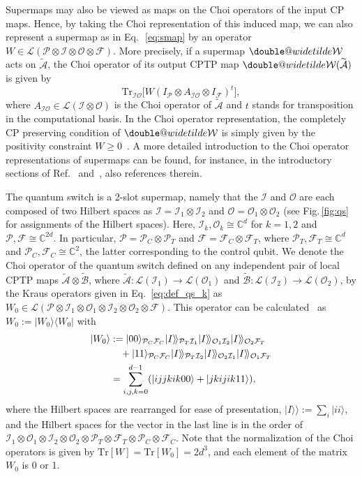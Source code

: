 \documentclass[a4paper,twocolumn,accepted=2022-10-23]{quantumarticle}
\makeatletter
\newcommand{\ket}[1]{\vert {#1} \rangle}
\newcommand{\kket}[1]{\vert {#1} \rangle\!\rangle}
\newcommand{\proj}[1]{\vert {#1} \rangle\!\langle {#1} \vert}
\newcommand{\Tr}[0]{{\mathrm{Tr}}}
\newcommand{\fcal}[0]{{\mathcal{F}}}
\newcommand{\ical}[0]{{\mathcal{I}}}
\newcommand{\ocal}[0]{{\mathcal{O}}}
\newcommand{\pcal}[0]{{\mathcal{P}}}
\newcommand{\lcal}[0]{{\mathcal{L}}}
\newcommand{\doublewidetilde}[1]{{%
  \mathpalette\double@widetilde{#1}%
}}
\newcommand{\double@widetilde}[2]{%
  \sbox\z@{$\m@th#1\widetilde{#2}$}%
  \ht\z@=.9\ht\z@
  \widetilde{\box\z@}%
}
\newcommand{\ttsmap}[1]{\doublewidetilde{\mbox{$\mathcal{#1}$}}}
\newcommand{\tmap}[1]{\widetilde{\mbox{$\mathcal{#1}$}}}
\theoremstyle{definition}
\makeatother
\begin{document}
Supermaps may also be viewed as maps on the Choi operators of the input CP maps. Hence, by taking the Choi representation of this induced map, we can also represent a supermap as in Eq.~\,\eqref{eq:smap} by an operator ${W\in \lcal(\pcal \otimes \ical \otimes \ocal \otimes \fcal)}$.
More precisely, if a supermap $\ttsmap{W}$ acts on $\tmap{A}$, the Choi operator of its output CPTP map $\ttsmap{W}(\tmap{A})$ is given by~\cite{comb1,comb3,qswitch}
\begin{equation}
\Tr_{\ical\ocal} \Big[W (I_\pcal \otimes A_{\ical\ocal} \otimes I_\fcal)^t\Big],
\end{equation}
where $A_{\ical\ocal} \in\lcal(\ical \otimes \ocal)$ is the Choi operator of $\tmap{A}$ and $t$ stands for transposition in the computational basis.
In the Choi operator representation, the completely CP preserving condition of $\ttsmap{W}$ is simply given by the positivity constraint $W \geq 0$~\cite{comb1,comb3}.
A more detailed introduction to the Choi operator representations of supermaps can be found, for instance, in the introductory sections of Ref.~\cite{indefinite_reversible} and~\cite{unitary_inversion2}, also references therein.


The quantum switch is a 2-slot supermap, namely that the $\ical$ and $\ocal$ are each composed of two Hilbert spaces as $\ical = \ical_1 \otimes \ical_2$ and $\ocal = \ocal_1 \otimes \ocal_2$ (see Fig.\,\ref{fig:qs} for assignments of the Hilbert spaces).
Here, $\ical_k, \ocal_k \cong \mathbb{C}^d$ for $k=1,2$ and $\pcal, \fcal \cong \mathbb{C}^{2d}$.
In particular, $\pcal = \pcal_C \otimes \pcal_T$ and $\fcal = \fcal_C \otimes \fcal_T$, where $\pcal_T, \fcal_T \cong \mathbb{C}^d$ and $\pcal_C, \fcal_C \cong \mathbb{C}^2$, the latter corresponding to the control qubit.
We denote the Choi operator of the quantum switch defined on any independent pair of local CPTP maps $\tmap{A} \otimes \tmap{B}$, where $\tmap{A} : \lcal(\ical_1) \to \lcal(\ocal_1)$ and $\tmap{B} : \lcal(\ical_2) \to \lcal(\ocal_2)$, by the Kraus operators given in Eq.~\eqref{eq:def_qs_k} as
 $W_0 \in \lcal(\pcal \otimes \ical_1 \otimes  \ocal_1\otimes \ical_2\otimes \ocal_2\otimes \fcal)$.
This operator can be calculated~\cite{qswitch} as $W_0 := \proj{W_0}$ with
\begin{align}
\ket{W_0} &:= \ket{00}_{\pcal_C \fcal_C} \kket{I}_{\pcal_T \ical_1} \kket{I}_{\ocal_1 \ical_2} \kket{I}_{\ocal_2 \fcal_T} \notag \\
&\quad+ \ket{11}_{\pcal_C \fcal_C} \kket{I}_{\pcal_T \ical_2} \kket{I}_{\ocal_2 \ical_1} \kket{I}_{\ocal_1 \fcal_T} \notag \\
&= \sum_{i,j,k=0}^{d-1} ( \ket{ijjkik00} + \ket{jkijik11} ), \label{eq:def_qs_w0}
\end{align}
where the Hilbert spaces are rearranged for ease of presentation, $\kket{I}:=\sum_{i}\ket{ii}$, and the Hilbert spaces for the vector in the last line is in the order of $\ical_1 \otimes \ocal_1 \otimes \ical_2 \otimes \ocal_2 \otimes \pcal_T  \otimes \fcal_T \otimes \pcal_C \otimes \fcal_C$.
Note that the normalization of the Choi operators is given by $\Tr [W] = \Tr [W_0] = 2 d^3$, and each element of the matrix $W_0$ is 0 or 1.
\end{document}
